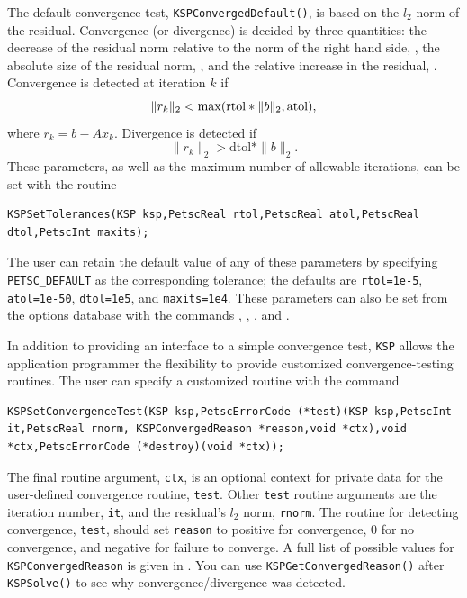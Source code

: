 The default convergence test, \lstinline{KSPConvergedDefault()}, is
based on the $l_2$-norm of the residual. Convergence
(or divergence) is decided by three quantities:
the decrease of the residual norm relative to the norm of the right hand side, , the absolute
size of the residual norm, , and the relative increase in the
residual, .  Convergence is detected at iteration $ k $ if
\[  \| r_k \|_2 < {\rm max} ( \text{rtol} * \| b \|_2, \text{atol}), \]
where $r_k = b - A x_k$.  Divergence is detected if
\[  \| r_k \|_2 > \text{dtol} * \| b \|_2. \]
These parameters, as well as the maximum number of allowable iterations,
can be set with the routine
\begin{lstlisting}
KSPSetTolerances(KSP ksp,PetscReal rtol,PetscReal atol,PetscReal dtol,PetscInt maxits);
\end{lstlisting}
The user can retain the default value of any of these parameters by
specifying \lstinline{PETSC_DEFAULT} as the
corresponding tolerance; the
defaults are \lstinline{rtol=1e-5}, \lstinline{atol=1e-50},
\lstinline{dtol=1e5}, and \lstinline{maxits=1e4}.
These parameters can also be set from the options database with the 
commands  ,  ,  ,
  
and  . 

In addition to providing an interface to a simple convergence test,
\lstinline{KSP} allows the application programmer the flexibility to provide
customized convergence-testing routines.  
The user can specify a customized
routine with the command
\begin{lstlisting}
KSPSetConvergenceTest(KSP ksp,PetscErrorCode (*test)(KSP ksp,PetscInt it,PetscReal rnorm, KSPConvergedReason *reason,void *ctx),void *ctx,PetscErrorCode (*destroy)(void *ctx));
\end{lstlisting}
The final routine argument, \lstinline{ctx}, is an optional context for private
data for the user-defined convergence routine, \lstinline{test}.  Other
\lstinline{test} routine arguments are the iteration
number, \lstinline{it}, and the residual's $ l_2 $ norm, \lstinline{rnorm}.
The routine for detecting convergence, \lstinline{test}, should set \lstinline{reason} to
positive for convergence, 0 for no convergence, and negative for
failure to converge.  A full list of possible values for \lstinline{KSPConvergedReason} is given in .
 You can use \lstinline{KSPGetConvergedReason()} after \lstinline{KSPSolve()} to see why
convergence/divergence was detected.

